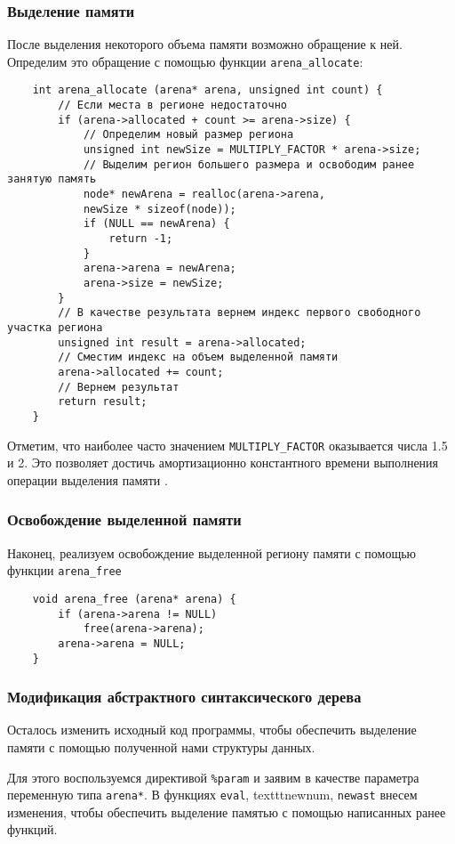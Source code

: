 \subsubsection{Выделение памяти}
После выделения некоторого объема памяти возможно обращение к ней.
Определим это обращение с помощью функции \verb|arena_allocate|:
\begin{verbatim}
    int arena_allocate (arena* arena, unsigned int count) {
        // Если места в регионе недостаточно
        if (arena->allocated + count >= arena->size) {
            // Определим новый размер региона
            unsigned int newSize = MULTIPLY_FACTOR * arena->size;
            // Выделим регион большего размера и освободим ранее занятую память
            node* newArena = realloc(arena->arena,
            newSize * sizeof(node));
            if (NULL == newArena) {
                return -1;
            }
            arena->arena = newArena;
            arena->size = newSize;
        }
        // В качестве результата вернем индекс первого свободного участка региона
        unsigned int result = arena->allocated;
        // Сместим индекс на объем выделенной памяти
        arena->allocated += count;
        // Вернем результат
        return result;
    }
\end{verbatim}
Отметим, что наиболее часто значением \verb|MULTIPLY_FACTOR| оказывается числа
1.5 и 2. Это позволяет достичь амортизационно константного времени выполнения 
операции выделения памяти \cite{Fbdoc}.

\subsubsection{Освобождение выделенной памяти}
Наконец, реализуем освобождение выделенной региону памяти с помощью функции 
\verb|arena_free|
\begin{verbatim}
    void arena_free (arena* arena) {
        if (arena->arena != NULL)
            free(arena->arena);
        arena->arena = NULL;
    }
\end{verbatim}

\subsubsection{Модификация абстрактного синтаксического дерева}
Осталось изменить исходный код программы, чтобы обеспечить выделение памяти с 
помощью полученной нами структуры данных.

Для этого воспользуемся директивой \texttt{\%param} и заявим в качестве 
параметра переменную типа \texttt{arena*}. В функциях \texttt{eval}, 
texttt{newnum}, \texttt{newast} внесем изменения, чтобы обеспечить выделение 
памятью с помощью написанных ранее функций.

